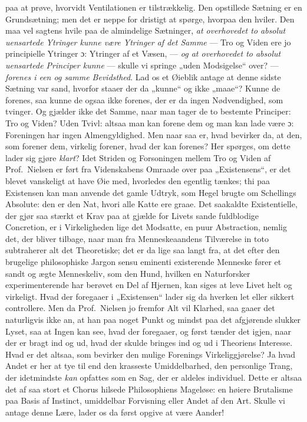 paa at prøve, hvorvidt Ventilationen er tilstrækkelig. Den opstillede Sætning
er en Grundsætning; men det er neppe for dristigt at spørge, hvorpaa den
hviler. Den maa vel sagtens hvile paa de almindelige Sætninger, \emph{at
overhovedet to absolut uensartede Ytringer kunne være Ytringer af det Samme}
--- Tro og Viden ere jo principielle Ytringer ɔ: Ytringer af et Væsen, ---
\emph{og at overhovedet to absolut uensartede Principer kunne} --- skulle vi
springe „uden Modsigelse“ over? --- \emph{forenes i een og samme Bevidsthed}.
Lad os et Øieblik antage at denne sidste Sætning var sand, hvorfor staaer der
da „kunne“ og ikke „maae“? Kunne de forenes, saa kunne de ogsaa ikke forenes,
der er da ingen Nødvendighed, som tvinger. Og gjælder ikke det Samme, naar man
tager de to bestemte Principer: Tro og Viden? Uden Tvivl: altsaa man kan
forene dem og man kan lade være ɔ: Foreningen har ingen Almengyldighed.
Men naar saa er, hvad bevirker da, at den, som forener dem, virkelig forener,
hvad der kan forenes? Her spørges, om dette lader sig gjøre \emph{klart}? Idet
Striden og Forsoningen mellem Tro og Viden af Prof.\ Nielsen er ført fra
Videnskabens Omraade over paa „Existensens“, er det blevet vanskeligt at have
Øie med, hvorledes den egentlig tænkes; thi paa Existensen kan man anvende det
gamle Udtryk, som Hegel brugte om Schellings Absolute: den er den Nat, hvori
alle Katte ere graae.
Det saakaldte Existentielle, der gjør saa stærkt et Krav paa at
gjælde for Livets sande fuldblodige Concretion, er i Virkeligheden lige det
Modsatte, en puur Abstraction, nemlig det, der bliver tilbage, naar man fra
Menneskeaandens Tilværelse in toto subtraherer alt det Theoretiske; det er da
lige saa langt fra, at det efter den brugelige philosophiske Jargon sensu
eminenti existerende Menneske fører et sandt og ægte Menneskeliv, som den
Hund, hvilken en Naturforsker experimenterende har berøvet en Del af Hjernen,
kan siges at leve Livet helt og virkeligt. Hvad der foregaaer i „Existensen“
lader sig da hverken let eller sikkert controllere. Men da Prof.\ Nielsen jo
fremfor Alt vil Klarhed, saa gaaer det naturligvis ikke an, at han paa noget
Punkt og mindst paa det afgjørende slukker Lyset, saa at Ingen kan see, hvad
der foregaaer, og først tænder det igjen, naar der er bragt ind og ud, hvad
der skulde bringes ind og ud i Theoriens Interesse. Hvad er det altsaa, som
bevirker den mulige Forenings Virkeliggjørelse? Ja hvad Andet er her at tye
til end den krasseste Umiddelbarhed, den personlige Trang, der idetmindste
\emph{kan} opfattes som en Sag, der er aldeles individuel. Dette er altsaa det
af saa stort et Chorus hilsede Philosophiens Mageløse: en høiere Brutalisme
paa Basis af Instinct, umiddelbar Forvisning eller Andet af den Art. Skulle vi
antage denne Lære, lader os da først opgive at være Aander!

